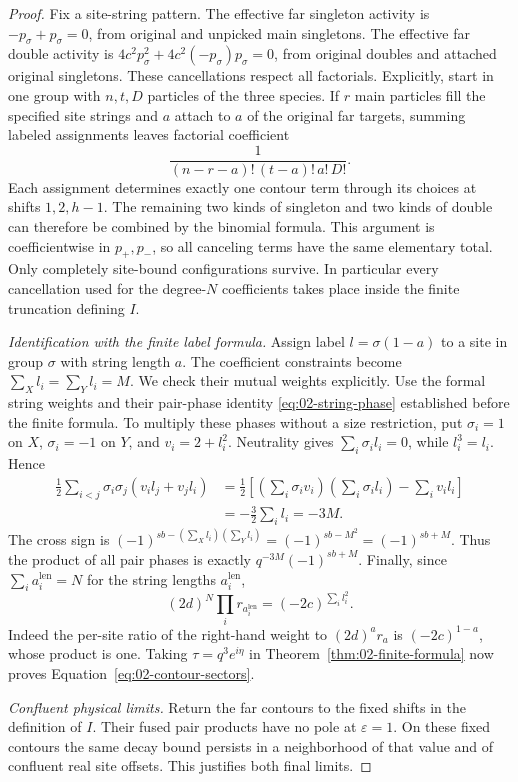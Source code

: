 \begin{proof}
Fix a site-string pattern. The effective far singleton activity is
$-p_\sigma+p_\sigma=0$, from original and unpicked main singletons.
The effective far double activity is
$4c^2p_\sigma^2+4c^2(-p_\sigma)p_\sigma=0$, from original doubles
and attached original singletons. These cancellations respect all
factorials. Explicitly, start in one group with $n,t,D$ particles of
the three species. If $r$ main particles fill the specified site
strings and $a$ attach to $a$ of the original far targets, summing
labeled assignments leaves factorial coefficient
\[
 \frac1{(n-r-a)!\,(t-a)!\,a!\,D!}.
\]
Each assignment determines exactly one contour term through its
choices at shifts $1,2,h-1$. The remaining two kinds of singleton
and two kinds of double can therefore be combined by the binomial
formula. This argument is coefficientwise in $p_+,p_-$, so all
canceling terms have the same elementary total. Only completely
site-bound configurations survive. In particular every cancellation
used for the degree-$N$ coefficients takes place inside the finite
truncation defining $I$.

\emph{Identification with the finite label formula.}
Assign label $l=\sigma(1-a)$ to a site in group $\sigma$ with string
length $a$. The coefficient constraints become
$\sum_{X}l_i=\sum_{Y}l_i=M$. We check their mutual weights explicitly.
Use the formal string weights and their pair-phase identity
\eqref{eq:02-string-phase} established before the finite formula.
To multiply these phases without a size restriction, put
$\sigma_i=1$ on $X$, $\sigma_i=-1$ on $Y$, and $v_i=2+l_i^2$.
Neutrality gives $\sum_i\sigma_i l_i=0$, while $l_i^3=l_i$. Hence
\[
\begin{aligned}
\frac12\sum_{i<j}\sigma_i\sigma_j(v_i l_j+v_j l_i)
 &=\frac12\left[
    \left(\sum_i\sigma_i v_i\right)
    \left(\sum_i\sigma_i l_i\right)-\sum_i v_i l_i\right]\\
 &=-\frac32\sum_i l_i=-3M.
\end{aligned}
\]
The cross sign is
$(-1)^{sb-(\sum_Xl_i)(\sum_Yl_i)}=(-1)^{sb-M^2}=(-1)^{sb+M}$.
Thus the product of all pair phases is exactly
$q^{-3M}(-1)^{sb+M}$. Finally, since $\sum_i a_i^{\mathrm{len}}=N$
for the string lengths $a_i^{\mathrm{len}}$,
\[
 (2d)^N\prod_i r_{a_i^{\mathrm{len}}}=(-2c)^{\sum_i l_i^2}.
\]
Indeed the per-site ratio of the right-hand weight to
$(2d)^a r_a$ is $(-2c)^{1-a}$, whose product is one.
Taking $\tau=q^3e^{i\eta}$ in Theorem~\ref{thm:02-finite-formula}
now proves Equation~\eqref{eq:02-contour-sectors}.

\emph{Confluent physical limits.}
Return the far contours to the fixed shifts in the definition of
$I$. Their fused pair products have no pole at $\varepsilon=1$.
On these fixed contours the same decay bound persists in a
neighborhood of that value and of confluent real site offsets.
This justifies both final limits.
\end{proof}


